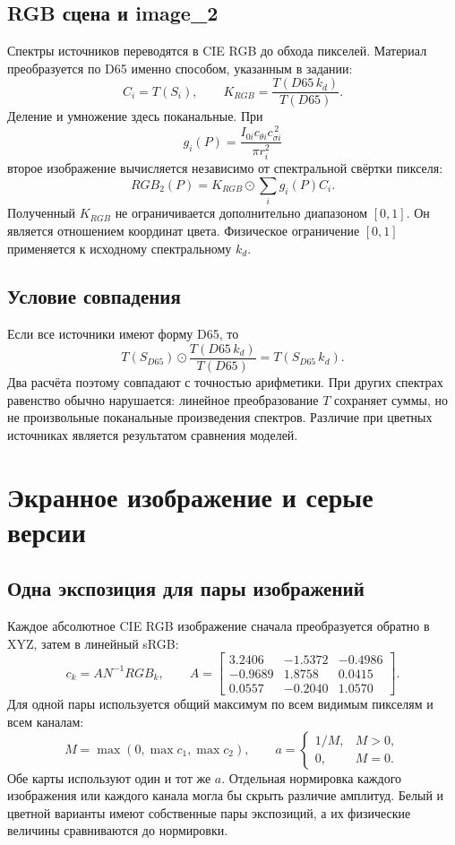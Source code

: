 \documentclass[a4paper,12pt]{article}
\begin{document}
\subsection{RGB сцена и image\_2}

Спектры источников переводятся в CIE RGB до обхода пикселей. Материал преобразуется по D65 именно способом, указанным в задании:
\[
 C_i=T(S_i),\qquad
 K_{RGB}=\frac{T(D65\,k_d)}{T(D65)}.
\]
Деление и умножение здесь поканальные. При
\[
 g_i(P)=\frac{I_{0i}c_{\theta i}c_{\sigma i}^{\,2}}{\pi r_i^2}
\]
второе изображение вычисляется независимо от спектральной свёртки пикселя:
\[
 RGB_2(P)=K_{RGB}\odot\sum_i g_i(P)C_i.
\]
Полученный $K_{RGB}$ не ограничивается дополнительно диапазоном $[0,1]$. Он является отношением координат цвета. Физическое ограничение $[0,1]$ применяется к исходному спектральному $k_d$.

\subsection{Условие совпадения}

Если все источники имеют форму D65, то
\[
 T(S_{D65})\odot\frac{T(D65\,k_d)}{T(D65)}
 =T(S_{D65}\,k_d).
\]
Два расчёта поэтому совпадают с точностью арифметики. При других спектрах равенство обычно нарушается: линейное преобразование $T$ сохраняет суммы, но не произвольные поканальные произведения спектров. Различие при цветных источниках является результатом сравнения моделей.

\clearpage
\section{Экранное изображение и серые версии}
\subsection{Одна экспозиция для пары изображений}

Каждое абсолютное CIE RGB изображение сначала преобразуется обратно в XYZ, затем в линейный sRGB:
\[
 c_k=A N^{-1}RGB_k,\qquad
 A=\begin{bmatrix}
 3.2406&-1.5372&-0.4986\\
 -0.9689&1.8758&0.0415\\
 0.0557&-0.2040&1.0570
 \end{bmatrix}.
\]
Для одной пары используется общий максимум по всем видимым пикселям и всем каналам:
\[
 M=\max(0,\max c_1,\max c_2),\qquad
 a=\begin{cases}1/M,&M>0,\\0,&M=0.\end{cases}
\]
Обе карты используют один и тот же $a$. Отдельная нормировка каждого изображения или каждого канала могла бы скрыть различие амплитуд. Белый и цветной варианты имеют собственные пары экспозиций, а их физические величины сравниваются до нормировки.
\end{document}
